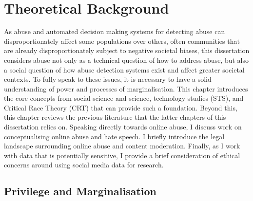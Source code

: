 

\chapter{Theoretical Background}\label{chap:socialscience}
As abuse and automated decision making systems for detecting abuse can disproportionately affect some populations over others, often communities that are already disproportionately subject to negative societal biases, this dissertation considers abuse not only as a technical question of how to address abuse, but also a social question of how abuse detection systems exist and affect greater societal contexts.
To fully speak to these issues, it is necessary to have a solid understanding of power and processes of marginalisation.
This chapter introduces the core concepts from social science and science, technology studies (STS), and Critical Race Theory (CRT) that can provide such a foundation. 
Beyond this, this chapter reviews the previous literature that the latter chapters of this dissertation relies on. 
Speaking directly towards online abuse, I discuss work on conceptualising online abuse and hate speech.
I briefly introduce the legal landscape surrounding online abuse and content moderation.
Finally, as I work with data that is potentially sensitive, I provide a brief consideration of ethical concerns around using social media data for research.


\section{Privilege and Marginalisation}

